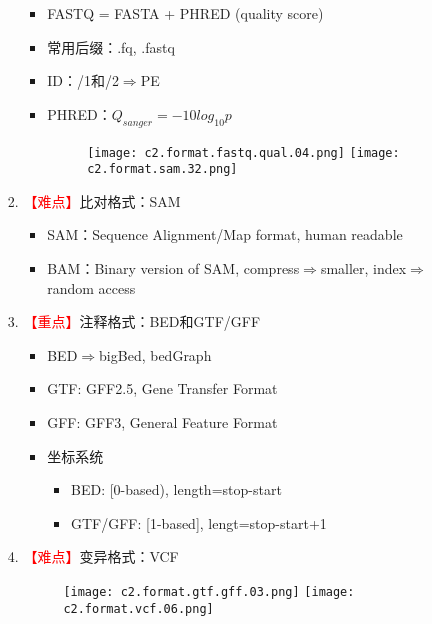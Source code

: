 \documentclass{TIJMUjiaoanLL}
\begin{document}
\begin{enumerate}
\begin{enumerate}
\begin{enumerate}
\begin{itemize}
              \item FASTQ = FASTA + PHRED (quality score)
              \item 常用后缀：.fq, .fastq
              \item ID：/1和/2$\Rightarrow$PE
              \item PHRED：$Q_{sanger} = -10log_{10}p$
            \vspace{-0.5em}
            \begin{figure}[h]
              \centering
              \texttt{[image: c2.format.fastq.qual.04.png]}
              \quad
              \texttt{[image: c2.format.sam.32.png]}
            \end{figure}
            \vspace{-0.5em}
            \end{itemize}
          \item \textcolor{red}{【难点】}比对格式：SAM
            \begin{itemize}
              \item SAM：Sequence Alignment/Map format, human readable
              \item BAM：Binary version of SAM, compress$\Rightarrow$smaller, index$\Rightarrow$random access
            \end{itemize}
          \item \textcolor{red}{【重点】}注释格式：BED和GTF/GFF
            \begin{itemize}
              \item BED$\Rightarrow$bigBed, bedGraph
              \item GTF: GFF2.5, Gene Transfer Format
              \item GFF: GFF3, General Feature Format
              \item 坐标系统
                \begin{itemize}
                  \item BED: [0-based), length=stop-start
                  \item GTF/GFF: [1-based], lengt=stop-start+1
                \end{itemize}
            \end{itemize}

\otherTail
\newpage
\otherHeader

          \item \textcolor{red}{【难点】}变异格式：VCF
            \vspace{-0.5em}
            \begin{figure}[h]
              \centering
              \texttt{[image: c2.format.gtf.gff.03.png]}
              \quad
              \texttt{[image: c2.format.vcf.06.png]}
            \end{figure}
            \vspace{-0.5em}
        \end{enumerate}
    \end{enumerate}


\end{enumerate}
\end{document}
